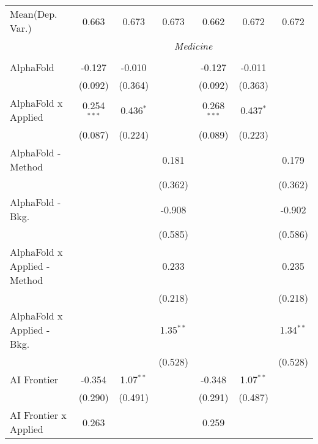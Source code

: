 \begin{tabular}{lcccccc}
Mean(Dep. Var.) & 0.663 & 0.673 & 0.673 & 0.662 & 0.672 & 0.672 \\
 & \multicolumn{6}{c}{\textit{Medicine}} \\ \\
   AlphaFold                    & -0.127        & -0.010      &              & -0.127        & -0.011      &   \\   
                                & (0.092)       & (0.364)     &              & (0.092)       & (0.363)     &   \\   
   AlphaFold x Applied          & 0.254$^{***}$ & 0.436$^{*}$ &              & 0.268$^{***}$ & 0.437$^{*}$ &   \\   
                                & (0.087)       & (0.224)     &              & (0.089)       & (0.223)     &   \\   
   AlphaFold - Method           &               &             & 0.181        &               &             & 0.179\\   
                                &               &             & (0.362)      &               &             & (0.362)\\   
   AlphaFold - Bkg.             &               &             & -0.908       &               &             & -0.902\\   
                                &               &             & (0.585)      &               &             & (0.586)\\   
   AlphaFold x Applied - Method &               &             & 0.233        &               &             & 0.235\\   
                                &               &             & (0.218)      &               &             & (0.218)\\   
   AlphaFold x Applied - Bkg.   &               &             & 1.35$^{**}$  &               &             & 1.34$^{**}$\\   
                                &               &             & (0.528)      &               &             & (0.528)\\   
   AI Frontier                  & -0.354        & 1.07$^{**}$ &              & -0.348        & 1.07$^{**}$ &   \\   
                                & (0.290)       & (0.491)     &              & (0.291)       & (0.487)     &   \\   
   AI Frontier x Applied        & 0.263         &             &              & 0.259         &             &   \\   

\end{tabular}
